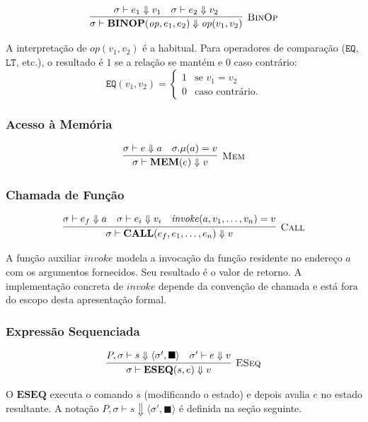 \[
  \infer[\textsc{BinOp}]
  {\sigma \vdash \mathbf{BINOP}(\mathit{op}, e_1, e_2) \Downarrow
  \mathit{op}(v_1, v_2)}
  {\sigma \vdash e_1 \Downarrow v_1 \quad
  \sigma \vdash e_2 \Downarrow v_2}
\]

A interpretação de $\mathit{op}(v_1, v_2)$ é a habitual.
Para operadores de comparação ($\mathtt{EQ}$, $\mathtt{LT}$, etc.),
o resultado é $1$ se a relação se mantém e $0$ caso contrário:
\[
  \mathtt{EQ}(v_1, v_2) =
  \begin{cases} 1 & \text{se } v_1 = v_2 \\ 0 & \text{caso contrário.}
  \end{cases}
\]

\subsubsection*{Acesso à Memória}

\[
  \infer[\textsc{Mem}]
  {\sigma \vdash \mathbf{MEM}(e) \Downarrow v}
  {\sigma \vdash e \Downarrow a \quad \sigma.\mu(a) = v}
\]

\subsubsection*{Chamada de Função}

\[
  \infer[\textsc{Call}]
  {\sigma \vdash \mathbf{CALL}(e_f, e_1, \ldots, e_n) \Downarrow v}
  {\sigma \vdash e_f   \Downarrow a \quad
    \sigma \vdash e_i   \Downarrow v_i \quad
  \mathit{invoke}(a, v_1,\ldots,v_n) = v}
\]

A função auxiliar $\mathit{invoke}$ modela a invocação da função residente no
endereço $a$ com os argumentos fornecidos.  Seu resultado é o valor de
retorno.  A implementação concreta de $\mathit{invoke}$ depende da convenção
de chamada e está fora do escopo desta apresentação formal.

\subsubsection*{Expressão Sequenciada}

\[
  \infer[\textsc{ESeq}]
  {\sigma \vdash \mathbf{ESEQ}(s, e) \Downarrow v}
  {P, \sigma \vdash s \Downarrow \langle \sigma', \blacksquare \rangle \quad
  \sigma' \vdash e \Downarrow v}
\]

O $\mathbf{ESEQ}$ executa o comando $s$ (modificando o estado) e depois
avalia $e$ no estado resultante.  A notação $P, \sigma \vdash s \Downarrow
\langle \sigma', \blacksquare \rangle$ é definida na seção seguinte.

